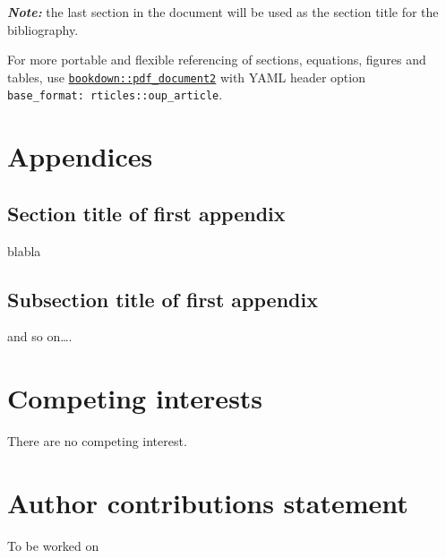 \documentclass[webpdf,large,contemporary,namedate]{oup-authoring-template}
\theoremstyle{thmstyleone}
\theoremstyle{thmstyletwo}
\theoremstyle{thmstylethree}
\begin{document}
\textbf{\emph{Note:}} the last section in the document will be used as
the section title for the bibliography.

For more portable and flexible referencing of sections, equations,
figures and tables, use
\href{https://github.com/rstudio/bookdown}{\texttt{bookdown::pdf\_document2}}
with YAML header option \texttt{base\_format:\ rticles::oup\_article}.

\hypertarget{appendices}{%
\section*{Appendices}\label{appendices}}

\begin{appendices}

\hypertarget{section-title-of-first-appendix}{%
\section{Section title of first
appendix}\label{section-title-of-first-appendix}}

blabla

\hypertarget{subsection-title-of-first-appendix}{%
\subsection{Subsection title of first
appendix}\label{subsection-title-of-first-appendix}}

and so on\ldots.

\end{appendices}

\section{Competing interests}

There are no competing interest.

\section{Author contributions statement}

To be worked on


\renewcommand\refname{References}




\end{document}
